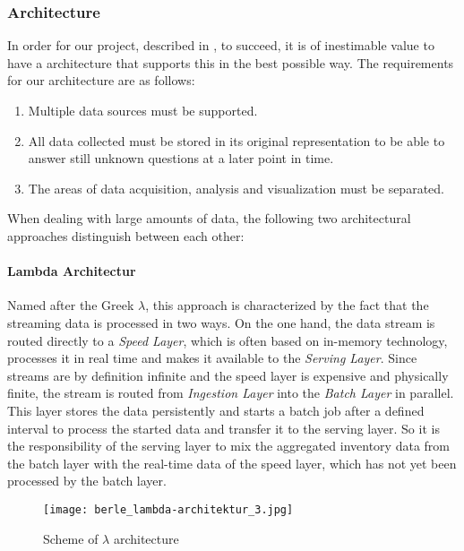 \subsubsection{Architecture}
\label{subsubsec:architecture}
In order for our project, described in , to succeed, it is of inestimable value to have a
architecture that supports this in the best possible way.
The requirements for our architecture are as follows:
\begin{enumerate}
  \item Multiple data sources must be supported.
  \item All data collected must be stored in its original representation to be able to answer still unknown questions at a later point in time.
  \item The areas of data acquisition, analysis and visualization must be separated.
\end{enumerate}
When dealing with large amounts of data, the following two architectural approaches distinguish between each other:
\newline
\paragraph{Lambda Architectur}
Named after the Greek $\lambda$, this approach is characterized by the fact that the streaming data is processed in two ways.
On the one hand, the data stream is routed directly to a \textit{Speed Layer}, which is often based on in-memory technology,
processes it in real time and makes it available to the \textit{Serving Layer}.
Since streams are by definition infinite and the speed layer is expensive and physically finite,
the stream is routed from \textit{Ingestion Layer} into the \textit{Batch Layer} in parallel.
This layer stores the data persistently and starts a batch job after a defined interval to process the started data and transfer it to the serving layer.
So it is the responsibility of the serving layer to mix the aggregated inventory data from the batch layer with the real-time data of the speed layer,
which has not yet been processed by the batch layer.\cite{lambda} \cite{jaxkappa}
\begin{figure}[h]
	\centering
	\texttt{[image: berle\_lambda-architektur\_3.jpg]}
	\caption[Scheme of $\lambda$ architecture]{Scheme of $\lambda$ architecture\cite{jaxkappa}}
	\label{fig:KafkaArchitecture}
\end{figure}
